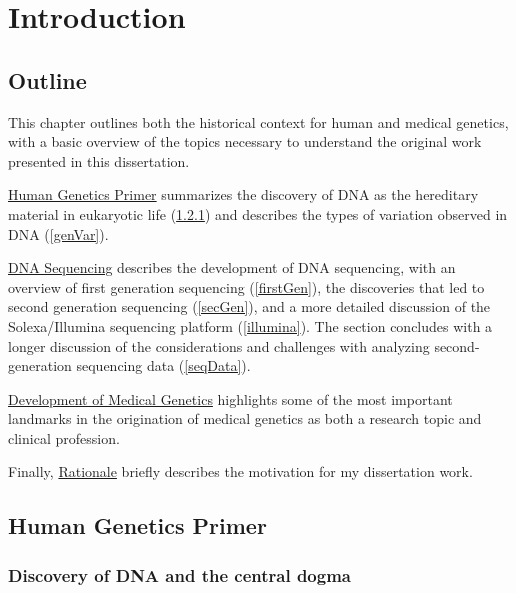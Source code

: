 \documentclass[11pt,letterpaper]{book}
\begin{document}
\mainmatter

\hypertarget{intro}{%
\chapter{Introduction}\label{intro}}

\hypertarget{outline}{%
\section{Outline}\label{outline}}

This chapter outlines both the historical context for human and medical genetics, with a basic overview of the topics necessary to understand the original work presented in this dissertation.

\protect\hyperlink{humGenPrime}{Human Genetics Primer} summarizes the discovery of DNA as the hereditary material in eukaryotic life (\ref{dnaDiscover}) and describes the types of variation observed in DNA (\ref{genVar}).

\protect\hyperlink{sequencing}{DNA Sequencing} describes the development of DNA sequencing, with an overview of first generation sequencing (\ref{firstGen}), the discoveries that led to second generation sequencing (\ref{secGen}), and a more detailed discussion of the Solexa/Illumina sequencing platform (\ref{illumina}). The section concludes with a longer discussion of the considerations and challenges with analyzing second-generation sequencing data (\ref{seqData}).

\protect\hyperlink{medGen}{Development of Medical Genetics} highlights some of the most important landmarks in the origination of medical genetics as both a research topic and clinical profession.

Finally, \protect\hyperlink{prob}{Rationale} briefly describes the motivation for my dissertation work.

\hypertarget{humGenPrime}{%
\section{Human Genetics Primer}\label{humGenPrime}}

\hypertarget{dnaDiscover}{%
\subsection{Discovery of DNA and the central dogma}\label{dnaDiscover}}
\end{document}
